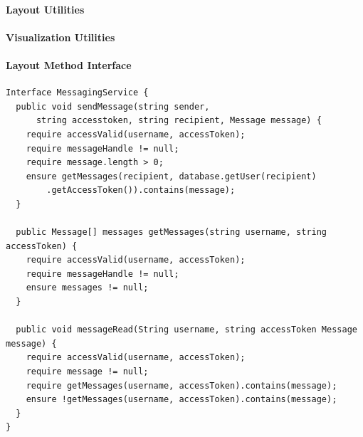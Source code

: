 			\paragraph{Layout Utilities}
			
			\paragraph{Visualization Utilities}
			
			\paragraph{Layout Method Interface}
			\begin{verbatim}
Interface MessagingService {
  public void sendMessage(string sender,
      string accesstoken, string recipient, Message message) {
    require accessValid(username, accessToken);
    require messageHandle != null;
    require message.length > 0;
    ensure getMessages(recipient, database.getUser(recipient)
        .getAccessToken()).contains(message);
  }

  public Message[] messages getMessages(string username, string accessToken) {
    require accessValid(username, accessToken);
    require messageHandle != null;
    ensure messages != null;
  }

  public void messageRead(String username, string accessToken Message message) {
    require accessValid(username, accessToken);
    require message != null;
    require getMessages(username, accessToken).contains(message);
    ensure !getMessages(username, accessToken).contains(message);
  }
}
\end{verbatim}
				
        

